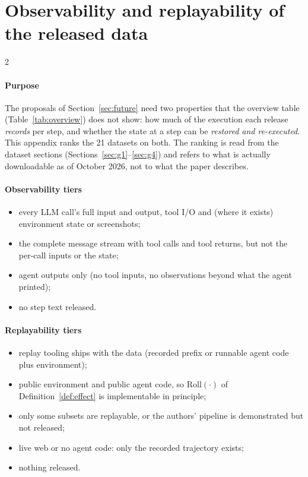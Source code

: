 \clearpage\appendix
\section{Observability and replayability of the released data}\label{app:obs}

\begin{multicols}{2}
\paragraph{Purpose} The proposals of Section~\ref{sec:future} need two properties that the overview table (Table~\ref{tab:overview}) does not show: how much of the execution each release \emph{records} per step, and whether the state at a step can be \emph{restored and re-executed}. This appendix ranks the 21 datasets on both. The ranking is read from the dataset sections (Sections~\ref{sec:g1}--\ref{sec:g4}) and refers to what is actually downloadable as of October 2026, not to what the paper describes.

\paragraph{Observability tiers}
\begin{itemize}[leftmargin=1.1em]
\item {} every LLM call's full input and output, tool I/O and (where it exists) environment state or screenshots;
\item {} the complete message stream with tool calls and tool returns, but not the per-call inputs or the state;
\item {} agent outputs only (no tool inputs, no observations beyond what the agent printed);
\item {} no step text released.
\end{itemize}

\paragraph{Replayability tiers}
\begin{itemize}[leftmargin=1.1em]
\item {} replay tooling ships with the data (recorded prefix or runnable agent code plus environment);
\item {} public environment and public agent code, so $\mathrm{Roll}(\cdot)$ of Definition~\ref{def:effect} is implementable in principle;
\item {} only some subsets are replayable, or the authors' pipeline is demonstrated but not released;
\item {} live web or no agent code: only the recorded trajectory exists;
\item {} nothing released.
\end{itemize}


\end{multicols}
